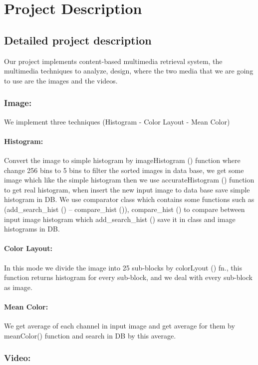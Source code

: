 \chapter{Project Description}
\section{Detailed project description}


Our project implements content-based multimedia retrieval system, the multimedia techniques to analyze, design,
 where the two media that we are going to use are the images and the videos.
 \vskip 0.25in

\subsection{Image:}
We implement three techniques (Histogram - Color Layout - Mean Color)
\vskip 0.2in
\subsubsection{Histogram:}
Convert the image to simple histogram by imageHistogram () function where change 256 bins to 5 bins to filter 
the sorted images in data base, we get some image which like the simple histogram then we use accurateHistogram ()
 function to get real histogram, when insert the new input image to data base save simple histogram in DB.
 \vskip 0.2in
 We use comparator class which contains some functions such as (add_search_hist () – compare_hist ()),
compare_hist () to compare between input image histogram which add_search_hist () save it in class  
 and image histograms in DB.

\vskip 0.2in
\subsubsection{Color Layout:}
In this mode we divide the image into 25 sub-blocks by colorLyout () fn., this function returns 
histogram for every sub-block, and we deal with every sub-block as image.

\vskip 0.2in
\subsubsection{Mean Color:}
We get average of each channel in input image and get average for them by meanColor() function 
and search in DB by this average.

\vskip 0.3in
\subsection{Video: }
